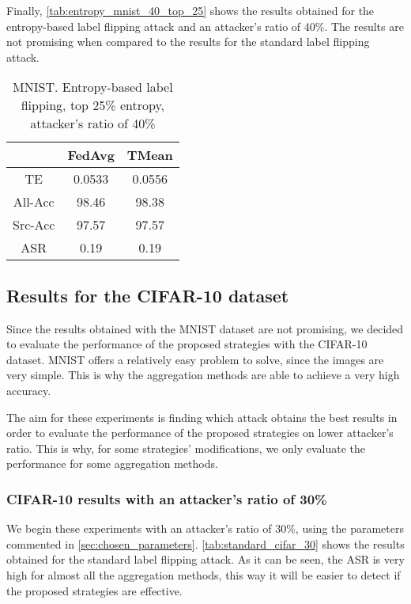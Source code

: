 Finally, \autoref{tab:entropy_mnist_40_top_25} shows the results obtained for the entropy-based label flipping attack and an attacker's ratio of 40\%.
The results are not promising when compared to the results for the standard label flipping attack.

\begin{table}[h!]
        \centering
        \begin{tabular}{|c|c|c|}
            \hline
            & FedAvg & TMean \\
            \hline
            TE & 0.0533 & 0.0556 \\
            \hline
            All-Acc & 98.46 & 98.38 \\
            \hline
            Src-Acc & 97.57 & 97.57 \\
            \hline
            ASR & 0.19 & 0.19 \\
            \hline
        \end{tabular}
        \caption{MNIST. Entropy-based label flipping, top 25\% entropy, attacker's ratio of 40\%}
        \label{tab:entropy_mnist_40_top_25}
    \end{table}
    

\subsection{Results for the CIFAR-10 dataset}
Since the results obtained with the MNIST dataset are not promising, we decided to evaluate the performance of the proposed strategies with the CIFAR-10 dataset.
MNIST offers a relatively easy problem to solve, since the images are very simple. This is why the aggregation methods are able to achieve a very high accuracy.

The aim for these experiments is finding which attack obtains the best results in order to evaluate the performance of the proposed strategies on lower attacker's ratio. This is why, for some strategies' modifications, we only evaluate the performance for some aggregation methods.

\subsubsection{CIFAR-10 results with an attacker's ratio of 30\%}\label{sec:cifar_30}
We begin these experiments with an attacker's ratio of 30\%, using the parameters commented in \ref{sec:chosen_parameters}.
\autoref{tab:standard_cifar_30} shows the results obtained for the standard label flipping attack.
As it can be seen, the ASR is very high for almost all the aggregation methods, this way it will be easier to detect if the proposed strategies are effective.

